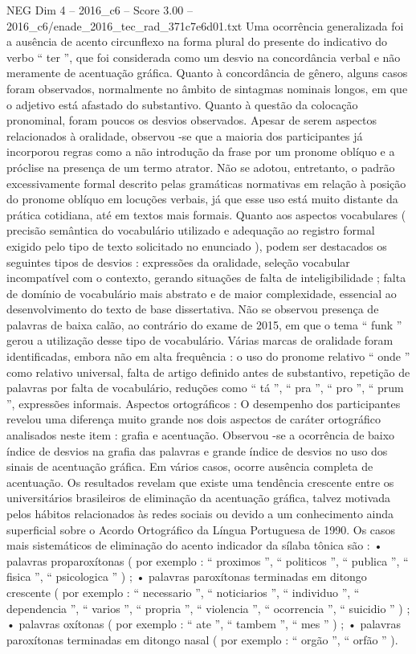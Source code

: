 \begin{textsample}{NEG Dim 4 – 2016\_c6 – Score 3.00 – 2016\_c6/enade\_2016\_tec\_rad\_371c7e6d01.txt}
Uma ocorrência generalizada foi a ausência de acento circunflexo na forma plural do presente do indicativo do verbo “ ter ”, que foi considerada como um desvio na concordância verbal e não meramente de acentuação gráfica.
Quanto à concordância de gênero, alguns casos foram observados, normalmente no âmbito de sintagmas nominais longos, em que o adjetivo está afastado do substantivo.
Quanto à questão da colocação pronominal, foram poucos os desvios observados.
Apesar de serem aspectos relacionados à oralidade, observou -se que a maioria dos participantes já incorporou regras como a não introdução da frase por um pronome oblíquo e a próclise na presença de um termo atrator.
Não se adotou, entretanto, o padrão excessivamente formal descrito pelas gramáticas normativas em relação à posição do pronome oblíquo em locuções verbais, já que esse uso está muito distante da prática cotidiana, até em textos mais formais.
Quanto aos aspectos vocabulares ( precisão semântica do vocabulário utilizado e adequação ao registro formal exigido pelo tipo de texto solicitado no enunciado ), podem ser destacados os seguintes tipos de desvios : expressões da oralidade, seleção vocabular incompatível com o contexto, gerando situações de falta de inteligibilidade ; falta de domínio de vocabulário mais abstrato e de maior complexidade, essencial ao desenvolvimento do texto de base dissertativa.
Não se observou presença de palavras de baixa calão, ao contrário do exame de 2015, em que o tema “ funk ” gerou a utilização desse tipo de vocabulário.
Várias marcas de oralidade foram identificadas, embora não em alta frequência : o uso do pronome relativo “ onde ” como relativo universal, falta de artigo definido antes de substantivo, repetição de palavras por falta de vocabulário, reduções como “ tá ”, “ pra ”, “ pro ”, “ prum ”, expressões informais.
Aspectos ortográficos : O desempenho dos participantes revelou uma diferença muito grande nos dois aspectos de caráter ortográfico analisados neste item : grafia e acentuação.
Observou -se a ocorrência de baixo índice de desvios na grafia das palavras e grande índice de desvios no uso dos sinais de acentuação gráfica.
Em vários casos, ocorre ausência completa de acentuação.
Os resultados revelam que existe uma tendência crescente entre os universitários brasileiros de eliminação da acentuação gráfica, talvez motivada pelos hábitos relacionados às redes sociais ou devido a um conhecimento ainda superficial sobre o Acordo Ortográfico da Língua Portuguesa de 1990.
Os casos mais sistemáticos de eliminação do acento indicador da sílaba tônica são : • palavras proparoxítonas ( por exemplo : “ proximos ”, “ politicos ”, “ publica ”, “ fisica ”, “ psicologica ” ) ; • palavras paroxítonas terminadas em ditongo crescente ( por exemplo : “ necessario ”, “ noticiarios ”, “ individuo ”, “ dependencia ”, “ varios ”, “ propria ”, “ violencia ”, “ ocorrencia ”, “ suicidio ” ) ; • palavras oxítonas ( por exemplo : “ ate ”, “ tambem ”, “ mes ” ) ; • palavras paroxítonas terminadas em ditongo nasal ( por exemplo : “ orgão ”, “ orfão ” ).

\end{textsample}
